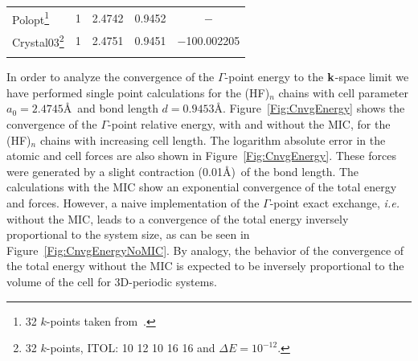\documentclass[prl,preprint,doublespace]{revtex4} %
\begin{document}
\begin{table}[t]
\begin{tabular}{lrllc}
%
%
    \hline
    {\sc Polopt}\footnote[2]{32 $k$-points taken from~\cite{DJacquemin99B}.} 
    & 1 & 2.4742 & 0.9452  & $-$\\
    {\sc Crystal03}\footnote[3]{32 $k$-points, ITOL: 10 12 10 16 16 and $\Delta E=10^{-12}$.}
    & 1 & 2.4751 & 0.9451 & $-$100.002205\\
    \botrule
  \end{tabular}
\end{table}

In order to analyze the convergence of the $\Gamma$-point energy to the ${\bf k}$-space limit
we have performed single point calculations for the 
(HF)$_n$ chains with cell parameter $a_0=2.4745$\AA~and bond length $d=0.9453$\AA.
Figure~\ref{Fig:CnvgEnergy} shows the convergence of the $\Gamma$-point relative energy,
with and without the MIC, for the (HF)$_n$ chains with increasing cell length.
The logarithm absolute error in the atomic and cell forces
are also shown in Figure~\ref{Fig:CnvgEnergy}.
These forces were generated by a slight contraction (0.01\AA)~of the bond length.
The calculations with the MIC show an exponential convergence of the total
energy and forces. However, a naive implementation of 
the $\Gamma$-point exact exchange, {\em i.e.} without the MIC, leads to a convergence 
of the total energy inversely proportional to the system size, as can be seen 
in Figure~\ref{Fig:CnvgEnergyNoMIC}. By analogy, the behavior of the convergence of the total energy
without the MIC is expected to be inversely proportional to the volume of the 
cell for 3D-periodic systems.
\end{document}
